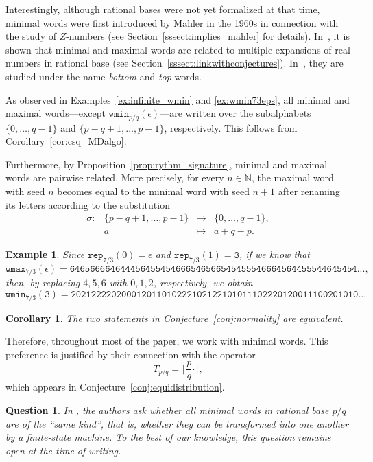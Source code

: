 \documentclass{template_arxiv}
\newtheorem{corollary}[theorem]{Corollary}
\newtheorem{example}[theorem]{Example}
\newtheorem{question}[theorem]{Question}
\numberwithin{equation}{section}
\newcommand{\N}{\mathbb N}
\newcommand{\eps}{\epsilon}
\newcommand{\wmax}{\mathtt{wmax}}
\newcommand{\wmin}{\mathtt{wmin}}
\newcommand{\rep}{\mathtt{rep}}
\begin{document}
Interestingly, although rational bases were not yet formalized at that time, minimal words were first introduced by Mahler in the 1960s in connection with the study of $Z$-numbers (see Section~\ref{sssect:implies_mahler} for details). In~\cite{AFS08,Aki08}, it is shown that minimal and maximal words are related to multiple expansions of real numbers in rational base (see Section~\ref{sssect:linkwithconjectures}). In~\cite{AMS18}, they are studied under the name \emph{bottom} and \emph{top} words.

\medskip
As observed in Examples~\ref{ex:infinite_wmin} and \ref{ex:wmin73eps}, all minimal and maximal words---except $\wmin_{p/q}(\eps)$---are written over the subalphabets $\{0,\dots,q-1\}$ and $\{p-q+1,\dots,p-1\}$, respectively. This follows from Corollary~\ref{cor:csq_MDalgo}.

Furthermore, by Proposition~\ref{prop:rythm_signature}, minimal and maximal words are pairwise related. More precisely, for every $n\in \N$, the maximal word with seed $n$ becomes equal to the minimal word with seed $n+1$ after renaming its letters according to the substitution
\[\begin{array}{lcll}
\sigma : &\{p-q+1,\dots,p-1\}& \to &\{0,\dots,q-1\}, \\
  &a &\mapsto &a+q-p.
  \end{array}
\]


\begin{example}\label{ex:lien_min_max}
Since $\rep_{7/3}(0)=\eps$ and $\rep_{7/3}(1)=\mathtt{3}$, if we know that
\[
\wmax_{7/3}(\eps)=
\mathtt{646566664644456455454666546566545455546664564455544645454...,}
\]
then, by replacing $4, 5, 6$ with $0, 1, 2$, respectively, we obtain
	\[
	\wmin_{7/3}(\mathtt{3})=
	\mathtt{202122220200012011010222102122101011102220120011100201010...}
	\]
\end{example}


\begin{corollary}\label{cor:conj1_redundant}
The two statements in Conjecture~\ref{conj:normality} are equivalent.
\end{corollary}
Therefore, throughout most of the paper, we work with minimal words. This preference is justified by their connection with the operator 
\[T_{p/q}=\Big\lceil \frac{p}{q} \bm{\cdot}\Big\rceil,\]
 which appears in Conjecture~\ref{conj:equidistribution}.



\begin{question} In \cite[Problem~71]{AMS18}, the authors ask whether all minimal words in rational base $p/q$ are of the ``same kind'', that is, whether they can be transformed into one another by a finite-state machine. To the best of our knowledge, this question remains open at the time of writing.
\end{question}
\end{document}
